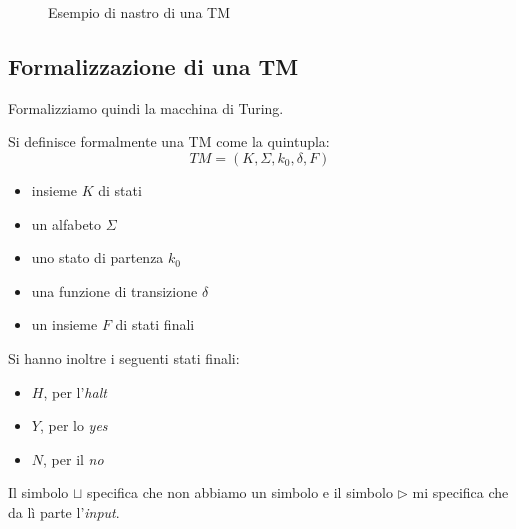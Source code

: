 \begin{figure}
  \centering
  \caption{Esempio di nastro di una TM}
  \label{fig:tur}
\end{figure}
\subsection{Formalizzazione di una TM}
Formalizziamo quindi la macchina di Turing.
\begin{definizione}
  Si definisce formalmente una TM come la quintupla:
  \[TM=(K,\Sigma,k_0, \delta, F)\]
  \begin{itemize}
    \item insieme $K$ di stati
    \item un alfabeto $\Sigma$
    \item uno stato di partenza $k_0$
    \item una funzione di transizione $\delta$
    \item un insieme $F$ di stati finali
  \end{itemize}
  Si hanno inoltre i seguenti stati finali:
  \begin{itemize}
    \item $H$, per l'\textit{halt}
    \item $Y$, per lo \textit{yes}
    \item $N$, per il \textit{no}
  \end{itemize}
  Il simbolo $\sqcup$ specifica che non abbiamo un simbolo e il simbolo
  $\triangleright$ mi specifica che da lì parte l'\textit{input}.
\end{definizione}

